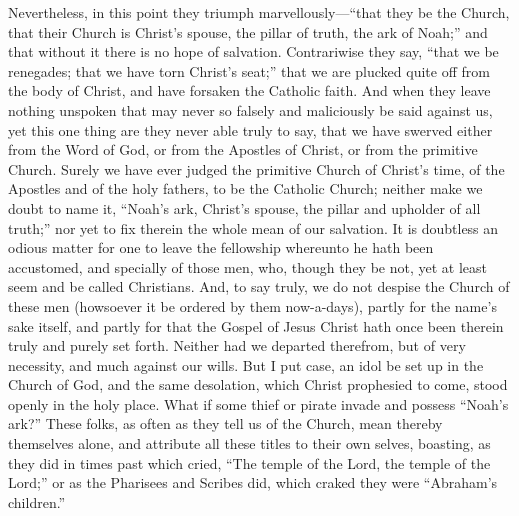 Nevertheless, in this point they triumph marvellously—“that
they be the Church, that their Church is Christ’s spouse, the
pillar of truth, the ark of Noah;” and that without it there is
no hope of salvation. Contrariwise they say, “that we be
renegades; that we have torn Christ’s seat;” that we are
plucked quite off from the body of Christ, and have forsaken the Catholic
faith. And when they leave nothing unspoken that may never so
falsely and maliciously be said against us, yet this one thing are they
never able truly to say, that we have swerved either from the Word of
God, or from the Apostles of Christ, or from the primitive Church.
Surely we have ever judged the primitive Church of Christ’s time,
of the Apostles and of the holy fathers, to be the Catholic Church;
neither make we doubt to name
it, “Noah’s ark, Christ’s spouse, the pillar and upholder
of all truth;” nor yet to fix therein the whole mean of our salvation.
It is doubtless an odious matter for one to leave the fellowship whereunto
he hath been accustomed, and specially of those men, who, though they
be not, yet at least seem and be called Christians. And, to say
truly, we do not despise the Church of these men (howsoever it be ordered
by them now-a-days), partly for the name’s sake itself, and partly
for that the Gospel of Jesus Christ hath once been therein truly and
purely set forth. Neither had we departed therefrom, but of very
necessity, and much against our wills. But I put case, an idol
be set up in the Church of God, and the same desolation, which Christ
prophesied to come, stood openly in the holy place. What if some
thief or pirate invade and possess “Noah’s ark?”
These folks, as often as they tell us of the Church, mean thereby themselves
alone, and attribute all these titles to their own selves, boasting,
as they did in times past which cried, “The temple of the Lord,
the temple of the Lord;” or as the Pharisees and Scribes did,
which craked they were “Abraham’s children.”

